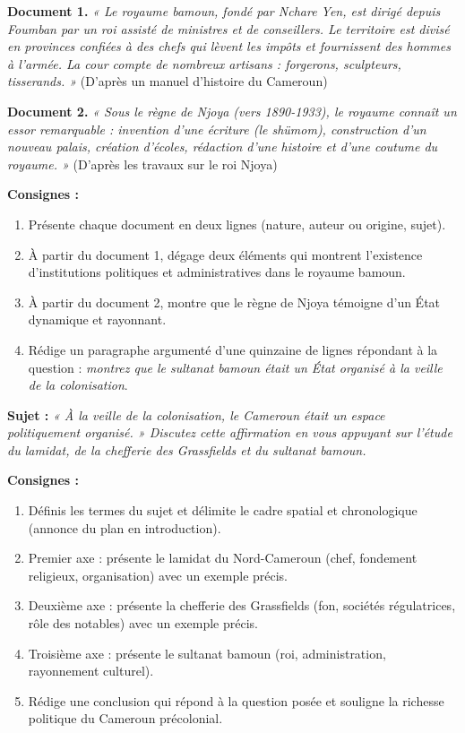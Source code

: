 \documentclass[11pt]{article}
\begin{document}
\begin{exercice}
\textbf{Document 1.} \emph{« Le royaume bamoun, fondé par Nchare Yen, est dirigé depuis Foumban par un roi assisté de ministres et de conseillers. Le territoire est divisé en provinces confiées à des chefs qui lèvent les impôts et fournissent des hommes à l'armée. La cour compte de nombreux artisans : forgerons, sculpteurs, tisserands. »} (D'après un manuel d'histoire du Cameroun)

\textbf{Document 2.} \emph{« Sous le règne de Njoya (vers 1890-1933), le royaume connaît un essor remarquable : invention d'une écriture (le shümom), construction d'un nouveau palais, création d'écoles, rédaction d'une histoire et d'une coutume du royaume. »} (D'après les travaux sur le roi Njoya)

\textbf{Consignes :}
\begin{enumerate}
\item Présente chaque document en deux lignes (nature, auteur ou origine, sujet).
\item À partir du document 1, dégage deux éléments qui montrent l'existence d'institutions politiques et administratives dans le royaume bamoun.
\item À partir du document 2, montre que le règne de Njoya témoigne d'un État dynamique et rayonnant.
\item Rédige un paragraphe argumenté d'une quinzaine de lignes répondant à la question : \emph{montrez que le sultanat bamoun était un État organisé à la veille de la colonisation}.
\end{enumerate}
\end{exercice}

\begin{exercice}
\textbf{Sujet :} \emph{« À la veille de la colonisation, le Cameroun était un espace politiquement organisé. » Discutez cette affirmation en vous appuyant sur l'étude du lamidat, de la chefferie des Grassfields et du sultanat bamoun.}

\textbf{Consignes :}
\begin{enumerate}
\item Définis les termes du sujet et délimite le cadre spatial et chronologique (annonce du plan en introduction).
\item Premier axe : présente le lamidat du Nord-Cameroun (chef, fondement religieux, organisation) avec un exemple précis.
\item Deuxième axe : présente la chefferie des Grassfields (fon, sociétés régulatrices, rôle des notables) avec un exemple précis.
\item Troisième axe : présente le sultanat bamoun (roi, administration, rayonnement culturel).
\item Rédige une conclusion qui répond à la question posée et souligne la richesse politique du Cameroun précolonial.
\end{enumerate}
\end{exercice}
\end{document}
